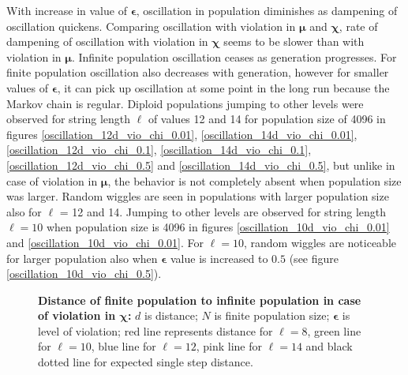 With increase in value of $\bm{\epsilon}$, 
oscillation in population diminishes as dampening of oscillation quickens. 
Comparing oscillation with violation in $\bm{\mu}$ and $\bm{\chi}$, rate of dampening of oscillation with violation 
in $\bm{\chi}$ seems to be slower than with violation in ${\bm{\mu}}$. 
Infinite population oscillation ceases as generation progresses.
For finite population oscillation also decreases with generation, however for smaller values of $\bm{\epsilon}$, 
it can pick up oscillation at some point in the long run because the Markov chain is regular.
Diploid populations jumping to other levels 
were observed for string length $\ell$ of values 12 and 14 for population size of 4096 in 
figures \ref{oscillation_12d_vio_chi_0.01}, \ref{oscillation_14d_vio_chi_0.01}, \ref{oscillation_12d_vio_chi_0.1}, 
\ref{oscillation_14d_vio_chi_0.1}, \ref{oscillation_12d_vio_chi_0.5} and \ref{oscillation_14d_vio_chi_0.5}, 
but unlike in case of violation in $\bm{\mu}$, the behavior is not completely absent when population size was larger. 
Random wiggles are seen in populations with larger population size also for $\ell$ = 12 and 14. 
Jumping to other levels are observed for string length $\ell = 10$ when population size is 4096 in figures \ref{oscillation_10d_vio_chi_0.01} 
and \ref{oscillation_10d_vio_chi_0.01}.
For $\ell = 10$, random wiggles are 
noticeable for larger population also when $\bm{\epsilon}$ value is increased to $0.5$ (see figure \ref{oscillation_10d_vio_chi_0.5}).

\begin{figure}[h]
\begin{center}
\hspace{-3em}%
\caption[\textbf{Distance of finite population to infinite population in case of violation in $\bm{\chi}$}]{\textbf{Distance of finite population to infinite population in case of violation in $\bm{\chi}$:}  
  $d$ is distance; $N$ is finite population size; $\bm{\epsilon}$ is level of violation; 
  red line represents distance for $\ell = 8$, green line for $\ell = 10$, blue line for $\ell = 12$, pink line for $\ell = 14$ 
  and black dotted line for expected single step distance.}
\label{vio_chi_dist}
\end{center}
\end{figure}

